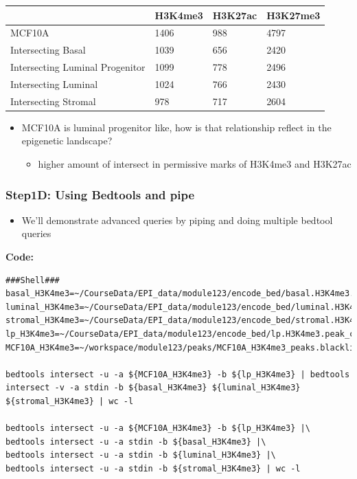 \documentclass[
]{book}
\providecommand{\tightlist}{%
  \setlength{\itemsep}{0pt}\setlength{\parskip}{0pt}}
\begin{document}
\begin{longtable}[]{@{}llll@{}}
\toprule\noalign{}
& H3K4me3 & H3K27ac & H3K27me3 \\
\midrule\noalign{}
\endhead
\bottomrule\noalign{}
\endlastfoot
MCF10A & 1406 & 988 & 4797 \\
Intersecting Basal & 1039 & 656 & 2420 \\
Intersecting Luminal Progenitor & 1099 & 778 & 2496 \\
Intersecting Luminal & 1024 & 766 & 2430 \\
Intersecting Stromal & 978 & 717 & 2604 \\
\end{longtable}

\begin{itemize}
\tightlist
\item
  MCF10A is luminal progenitor like, how is that relationship reflect in the epigenetic landscape?

  \begin{itemize}
  \tightlist
  \item
    higher amount of intersect in permissive marks of H3K4me3 and H3K27ac
  \end{itemize}
\end{itemize}

\subsubsection{Step1D: Using Bedtools and pipe}\label{step1d-using-bedtools-and-pipe}

\begin{itemize}
\tightlist
\item
  We'll demonstrate advanced queries by piping and doing multiple bedtool queries
\end{itemize}

\textbf{Code:}

\begin{verbatim}
###Shell###
basal_H3K4me3=~/CourseData/EPI_data/module123/encode_bed/basal.H3K4me3.peak_calls.bed
luminal_H3K4me3=~/CourseData/EPI_data/module123/encode_bed/luminal.H3K4me3.peak_calls.bed
stromal_H3K4me3=~/CourseData/EPI_data/module123/encode_bed/stromal.H3K4me3.peak_calls.bed
lp_H3K4me3=~/CourseData/EPI_data/module123/encode_bed/lp.H3K4me3.peak_calls.bed
MCF10A_H3K4me3=~/workspace/module123/peaks/MCF10A_H3K4me3_peaks.blacklistRemoved.narrowPeak

bedtools intersect -u -a ${MCF10A_H3K4me3} -b ${lp_H3K4me3} | bedtools intersect -v -a stdin -b ${basal_H3K4me3} ${luminal_H3K4me3} ${stromal_H3K4me3} | wc -l

bedtools intersect -u -a ${MCF10A_H3K4me3} -b ${lp_H3K4me3} |\
bedtools intersect -u -a stdin -b ${basal_H3K4me3} |\
bedtools intersect -u -a stdin -b ${luminal_H3K4me3} |\
bedtools intersect -u -a stdin -b ${stromal_H3K4me3} | wc -l
\end{verbatim}
\end{document}
